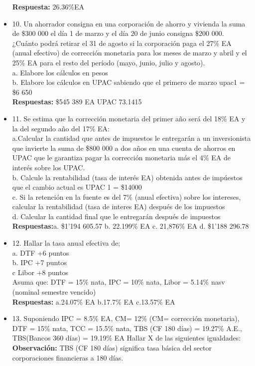\begin{itemize}
	\textbf{Respuesta:} 26.36\%EA\\ 
	\medskip
	\item 10. Un ahorrador consigna en una corporación de ahorro y vivienda la suma de \$300 000 el día 1 de  marzo y el día 20 de junio consigna \$200 000.  ¿Cuánto  podrá  retirar  el  31  de  agosto  si la corporación  paga el  27\% EA  (anual efectivo) de corrección monetaria para los meses de marzo y abril y el 25\% EA  para el resto del período (mayo, junio, julio y agosto).\\
	a. Elabore los cálculos en pesos\\
	b. Elabore los cálculos en UPAC sabiendo que el primero de marzo upac1 = \$6 650\\
	\textbf{Respuestas:} \$545 389 EA\hspace{0,5cm} UPAC 73.1415\\
	\medskip
	\item 11. Se estima que la corrección monetaria del primer año será del 18\% EA y la del segundo año del 17\% EA:\\
	a.Calcular la cantidad que antes de impuestos le entregarán a un inversionista que invierte la suma de \$800 000 a dos años en una cuenta de ahorros en UPAC que le garantiza pagar la corrección monetaria más el 4\% EA de interés sobre los UPAC.\\
	b. Calcule la rentabilidad (tasa de interés EA) obtenida antes de impúestos que el cambio actual es UPAC 1 = \$14000\\
	c. Si la retención en la fuente es del 7\% (anual efectiva) sobre los intereses, calcular la rentabilidad (tasa de interes EA) después de los impuestos\\
	d. Calcular la cantidad final que le entregarán después de impuestos\\
	\textbf{Respuestas:}a. \$1'194 605.57 \hspace{0,5cm} b. 22.199\% EA\hspace{0,5cm} c. 21,876\% EA\hspace{0,5cm} d. \$1'188 296.78\\
	\medskip
	\item 12. Hallar la tasa anual efectiva de;\\
	a. DTF +6 puntos\\
	b. IPC +7 puntos\\
	c Libor +8 puntos\\
	Asuma que: DTF = 15\% nata, IPC = 10\% nata, Libor = 5.14\% nasv (nominal semestre vencido)\\
	\textbf{Respuestas:} a.24.07\% EA\hspace{0,5cm} b.17.7\% EA\hspace{0,5cm} c.13.57\% EA\\
	\medskip
	\item 13. Suponiendo IPC = 8.5\% EA, CM= 12\% (CM= corrección monetaria), DTF = 15\% nata, TCC = 15.5\% nata, TBS (CF 180 días) = 19.27\% A.E., TBS(Bancos 360 días) = 19.19\% EA Hallar X de las siguientes igualdades:\\
	\textbf{Observación:} TBS (CF 180 días) significa tasa básica del sector corporaciones financieras a 180 días.\\
	

\end{itemize}
